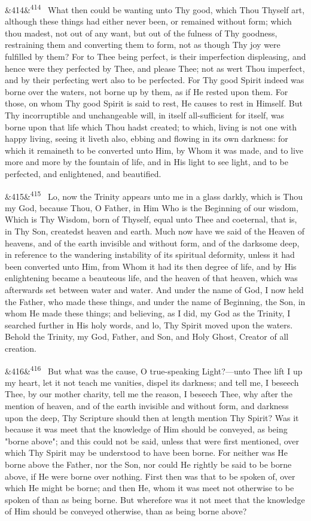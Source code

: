 \documentclass[12pt]{article}
\newcommand{\para}[1][]{\par\noindent\ifx&#1&\else\textsuperscript{\footnotesize #1}~\fi}
\begin{document}
\para[414] What then could be wanting unto Thy good, which Thou Thyself art, although these things had either never been, or remained without form; which thou madest, not out of any want, but out of the fulness of Thy goodness, restraining them and converting them to form, not as though Thy joy were fulfilled by them? For to Thee being perfect, is their imperfection displeasing, and hence were they perfected by Thee, and please Thee; not as wert Thou imperfect, and by their perfecting wert also to be perfected. For Thy good Spirit indeed was borne over the waters, not borne up by them, as if He rested upon them. For those, on whom Thy good Spirit is said to rest, He causes to rest in Himself. But Thy incorruptible and unchangeable will, in itself all-sufficient for itself, was borne upon that life which Thou hadst created; to which, living is not one with happy living, seeing it liveth also, ebbing and flowing in its own darkness: for which it remaineth to be converted unto Him, by Whom it was made, and to live more and more by the fountain of life, and in His light to see light, and to be perfected, and enlightened, and beautified.

\para[415] Lo, now the Trinity appears unto me in a glass darkly, which is Thou my God, because Thou, O Father, in Him Who is the Beginning of our wisdom, Which is Thy Wisdom, born of Thyself, equal unto Thee and coeternal, that is, in Thy Son, createdst heaven and earth. Much now have we said of the Heaven of heavens, and of the earth invisible and without form, and of the darksome deep, in reference to the wandering instability of its spiritual deformity, unless it had been converted unto Him, from Whom it had its then degree of life, and by His enlightening became a beauteous life, and the heaven of that heaven, which was afterwards set between water and water. And under the name of God, I now held the Father, who made these things, and under the name of Beginning, the Son, in whom He made these things; and believing, as I did, my God as the Trinity, I searched further in His holy words, and lo, Thy Spirit moved upon the waters. Behold the Trinity, my God, Father, and Son, and Holy Ghost, Creator of all creation.

\para[416] But what was the cause, O true-speaking Light?---unto Thee lift I up my heart, let it not teach me vanities, dispel its darkness; and tell me, I beseech Thee, by our mother charity, tell me the reason, I beseech Thee, why after the mention of heaven, and of the earth invisible and without form, and darkness upon the deep, Thy Scripture should then at length mention Thy Spirit? Was it because it was meet that the knowledge of Him should be conveyed, as being "borne above"; and this could not be said, unless that were first mentioned, over which Thy Spirit may be understood to have been borne. For neither was He borne above the Father, nor the Son, nor could He rightly be said to be borne above, if He were borne over nothing. First then was that to be spoken of, over which He might be borne; and then He, whom it was meet not otherwise to be spoken of than as being borne. But wherefore was it not meet that the knowledge of Him should be conveyed otherwise, than as being borne above?
\end{document}
